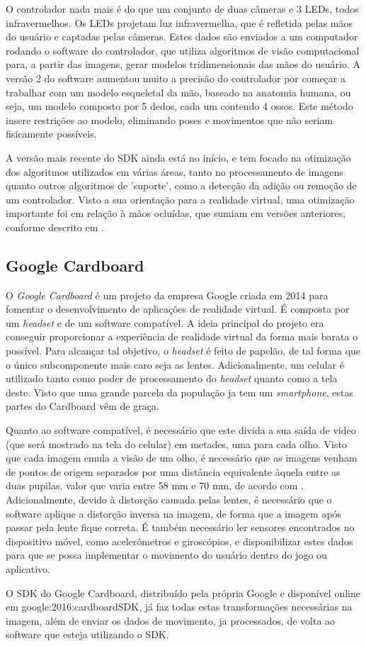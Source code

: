 O controlador nada mais é do que um conjunto de duas câmeras e 3 LEDs, todos infravermelhos. Os LEDs projetam luz infravermelha, que é refletida pelas mãos do usuário e captadas pelas câmeras. Estes dados são enviados a um computador rodando o software do controlador, que utiliza algoritmos de visão computacional para, a partir das imagens, gerar modelos tridimensionais das mãos do usuário. A versão 2 do software aumentou muito a precisão do controlador por começar a trabalhar com um modelo esqueletal da mão, baseado na anatomia humana, ou seja, um modelo composto por 5 dedos, cada um contendo 4 ossos. Este método insere restrições ao modelo, eliminando poses e movimentos que não seriam fisicamente possíveis.

A versão mais recente do SDK ainda está no início, e tem focado na otimização dos algoritmos utilizados em várias áreas, tanto no processamento de imagens quanto outros algoritmos de 'suporte', como a detecção da adição ou remoção de um controlador. Visto a sua orientação para a realidade virtual, uma otimização importante foi em relação à mãos ocluídas, que sumiam em versões anteriores, conforme descrito em \cite{leap:2016:changeset}.


\subsection{Google Cardboard}\label{subsec-teo-google-cardboard}

O \textit{Google Cardboard} é um projeto da empresa Google criada em 2014 para fomentar o desenvolvimento de aplicações de realidade virtual. É composta por um \textit{headset} e de um software compatível. A ideia principal do projeto era conseguir proporcionar a experiência de realidade virtual da forma mais barata o possível. Para alcançar tal objetivo, o \textit{headset} é feito de papelão, de tal forma que o único subcomponente mais caro seja as lentes. Adicionalmente, um celular é utilizado tanto como poder de processamento do \textit{headset} quanto como a tela deste. Visto que uma grande parcela da população ja tem um \textit{smartphone}, estas partes do Cardboard vêm de graça.

Quanto ao software compatível, é necessário que este divida a sua saída de video (que será mostrado na tela do celular) em metades, uma para cada olho. Visto que cada imagem emula a visão de um olho, é necessário que as imagens venham de pontos de origem separados por uma distância equivalente àquela entre as duas pupilas, valor que varia entre 58 mm e 70 mm, de acordo com \cite{dodgson:2004:svariation}. Adicionalmente, devido à distorção causada pelas lentes, é necessário que o software aplique a distorção inversa na imagem, de forma que a imagem após passar pela lente fique correta. É também necessário ler sensores encontrados no dispositivo móvel, como acelerômetros e giroscópios, e disponibilizar estes dados para que se possa implementar o movimento do usuário dentro do jogo ou aplicativo.

O SDK do Google Cardboard, distribuído pela própria Google e disponível online em google:2016:cardboardSDK, já faz todas estas transformações necessárias na imagem, além de enviar os dados de movimento, ja processados, de volta ao software que esteja utilizando o SDK.